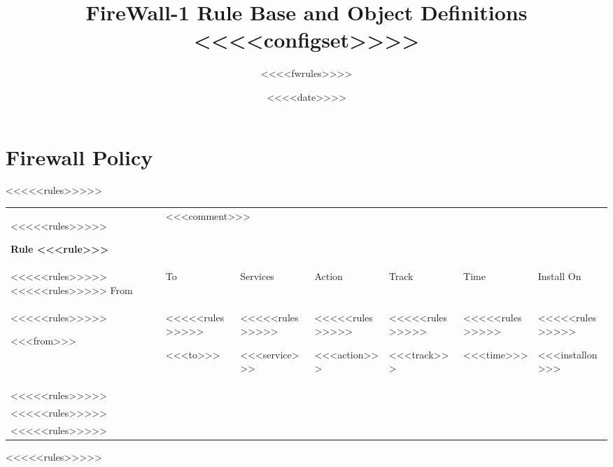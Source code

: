 \documentclass [german,11pt]{article}
\begin{document}
\landscape
\pagestyle{headings}
\thispagestyle{empty}
\renewcommand{\arraystretch}{1.1}

\title{FireWall-1 Rule Base and Object Definitions\\<<<<configset>>>>}
\author{<<<<fwrules>>>>}
\date{<<<<date>>>>} 

\maketitle

\tableofcontents

\section{Firewall Policy}
<<<<<rules>>>>>\begin{tabular}{lllllll}
<<<<<rules>>>>>    \begin{minipage}[t]{0.19\linewidth}\textbf{Rule <<<rule>>>}\end{minipage} & \multicolumn{6}{l}{\begin{minipage}{0.84\linewidth}<<<comment>>>\end{minipage}}\\
<<<<<rules>>>>>    \hline
<<<<<rules>>>>>    From	& To & Services & Action & Track & Time & Install On\\
<<<<<rules>>>>>    \begin{minipage}[t]{0.19\linewidth} <<<from>>> \end{minipage} & %
<<<<<rules>>>>>    \begin{minipage}[t]{0.19\linewidth} <<<to>>> \end{minipage} & %
<<<<<rules>>>>>    \begin{minipage}[t]{0.19\linewidth} <<<service>>> \end{minipage} & %
<<<<<rules>>>>>    \begin{minipage}[t]{0.07\linewidth} <<<action>>> \end{minipage} & %
<<<<<rules>>>>>    \begin{minipage}[t]{0.06\linewidth} <<<track>>>\mbox{\hspace{1pt}} \end{minipage} & %
<<<<<rules>>>>>    \begin{minipage}[t]{0.07\linewidth} <<<time>>> \end{minipage} & %
<<<<<rules>>>>>    \begin{minipage}[t]{0.1\linewidth} <<<installon>>> \end{minipage} \\
<<<<<rules>>>>>    & & \\
<<<<<rules>>>>>    & & \\
<<<<<rules>>>>>\end{tabular}
<<<<<rules>>>>>
\end{document}
